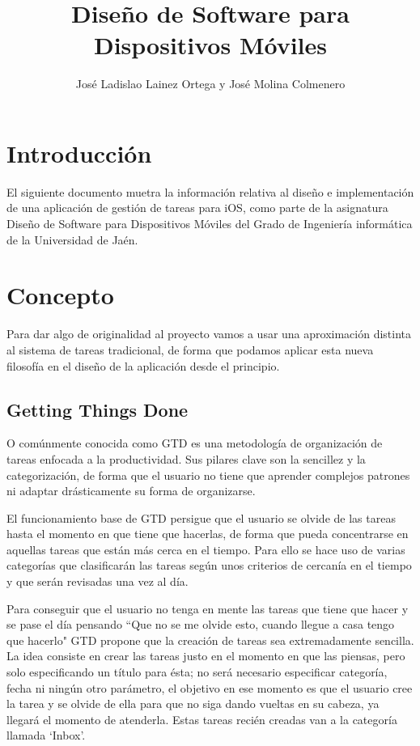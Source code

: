\documentclass[parskip=half*]{scrartcl}
\title{Dise\~no de Software para Dispositivos M\'oviles}
\author{Jos\'e Ladislao Lainez Ortega y Jos\'e Molina Colmenero}
\begin{document}

\lstset{language=[Objective]C, breakindent=40pt, breaklines}


\maketitle
\vfill
\tableofcontents

\newpage


\section{Introducci\'on}
El siguiente documento muetra la informaci\'on relativa al dise\~no e implementaci\'on de una aplicaci\'on de gesti\'on de tareas para iOS, como parte de la asignatura Dise\~no de Software para Dispositivos M\'oviles del Grado de Ingenier\'ia inform\'atica de la Universidad de Ja\'en.

\section{Concepto}
Para dar algo de originalidad al proyecto vamos a usar una aproximaci\'on distinta al sistema de tareas tradicional, de forma que podamos aplicar esta nueva filosof\'ia en el dise\~no de la aplicaci\'on desde el principio.

\subsection{Getting Things Done}
O com\'unmente conocida como GTD es una metodolog\'ia de organizaci\'on de tareas enfocada a la productividad. Sus pilares clave son la sencillez y la categorizaci\'on, de forma que el usuario no tiene que aprender complejos patrones ni adaptar dr\'asticamente su forma de organizarse.

El funcionamiento base de GTD persigue que el usuario se olvide de las tareas hasta el momento en que tiene que hacerlas, de forma que pueda concentrarse en aquellas tareas que est\'an m\'as cerca en el tiempo. Para ello se hace uso de varias categor\'ias que clasificar\'an las tareas seg\'un unos criterios de cercan\'ia en el tiempo y que ser\'an revisadas una vez al d\'ia.

Para conseguir que el usuario no tenga en mente las tareas que tiene que hacer y se pase el d\'ia pensando ``Que no se me olvide esto, cuando llegue a casa tengo que hacerlo" GTD propone que la creaci\'on de tareas sea extremadamente sencilla. La idea consiste en crear las tareas justo en el momento en que las piensas, pero solo especificando un t\'itulo para \'esta; no ser\'a necesario especificar categor\'ia, fecha ni ning\'un otro par\'ametro, el objetivo en ese momento es que el usuario cree la tarea y se olvide de ella para que no siga dando vueltas en su cabeza, ya llegar\'a el momento de atenderla. Estas tareas reci\'en creadas van a la categor\'ia llamada `Inbox'.
\end{document}

